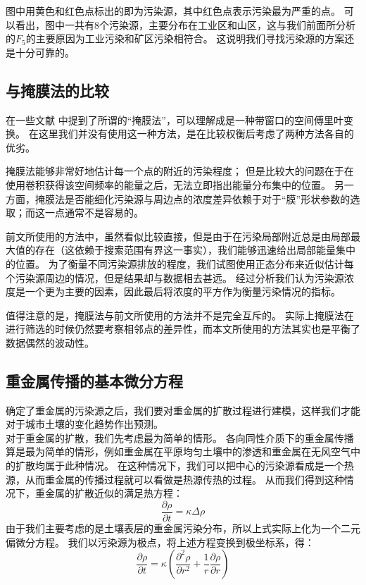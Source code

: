 \documentclass[a4paper]{article}
\begin{document}
图中用黄色和红色点标出的即为污染源，其中红色点表示污染最为严重的点。
可以看出，图中一共有8个污染源，主要分布在工业区和山区，这与我们前面所分析的$F_5$的主要原因为工业污染和矿区污染相符合。
这说明我们寻找污染源的方案还是十分可靠的。
\subsection{与掩膜法的比较}
在一些文献 \cite{GEAN:GEAN338} \cite{mitchell_2012} 中提到了所谓的“掩膜法”，可以理解成是一种带窗口的空间傅里叶变换。
在这里我们并没有使用这一种方法，是在比较权衡后考虑了两种方法各自的优劣。

掩膜法能够非常好地估计每一个点的附近的污染程度；
但是比较大的问题在于在使用卷积获得该空间频率的能量之后，无法立即指出能量分布集中的位置。
另一方面，掩膜法是否能细化污染源与周边点的浓度差异依赖于对于“膜”形状参数的选取；而这一点通常不是容易的。

前文所使用的方法中，虽然看似比较直接，但是由于在污染局部附近总是由局部最大值的存在（这依赖于搜索范围有界这一事实），我们能够迅速给出局部能量集中的位置。
为了衡量不同污染源排放的程度，我们试图使用正态分布来近似估计每个污染源周边的情况，但是结果却与数据相去甚远。
经过分析我们认为污染源浓度是一个更为主要的因素，因此最后将浓度的平方作为衡量污染情况的指标。

值得注意的是，掩膜法与前文所使用的方法并不是完全互斥的。
实际上掩膜法在进行筛选的时候仍然要考察相邻点的差异性，而本文所使用的方法其实也是平衡了数据偶然的波动性。

\subsection{重金属传播的基本微分方程}
确定了重金属的污染源之后，我们要对重金属的扩散过程进行建模，这样我们才能对于城市土壤的变化趋势作出预测。  \\
\indent 对于重金属的扩散，我们先考虑最为简单的情形。
各向同性介质下的重金属传播算是最为简单的情形，例如重金属在平原均匀土壤中的渗透和重金属在无风空气中的扩散均属于此种情况。
在这种情况下，我们可以把中心的污染源看成是一个热源，从而重金属的传播过程就可以看做是热源传热的过程。
从而我们得到这种情况下，重金属的扩散近似的满足热方程：
\begin{equation}
\frac{\partial \rho}{\partial t} = \kappa \Delta \rho
\end{equation}
由于我们主要考虑的是土壤表层的重金属污染分布，所以上式实际上化为一个二元偏微分方程。
我们以污染源为极点，将上述方程变换到极坐标系，得：
\begin{equation}
\frac{\partial \rho}{\partial t} = \kappa(\frac{\partial^2 \rho}{\partial r^2}+\frac{1}{r}\frac{\partial \rho}{\partial r})
\end{equation}
\end{document}
